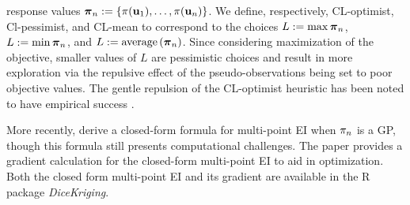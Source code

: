 \documentclass[12pt]{article}
\begin{document}
response values $\boldsymbol{\pi}_{n} := \{\pi(\mathbf{u}_1), \dots, \pi(\mathbf{u}_{n})\}$. We define, respectively, 
CL-optimist, Cl-pessimist, and CL-mean to correspond to the choices $L := \max \boldsymbol{\pi}_{n}$, 
$L := \min \boldsymbol{\pi}_{n}$, and $L := \text{average}\left(\boldsymbol{\pi}_{n}\right)$. Since considering maximization of the 
objective, smaller values of $L$ are pessimistic choices and result in more exploration via the repulsive effect of the pseudo-observations being set to poor 
objective values. The gentle repulsion of the CL-optimist heuristic has been noted to have empirical success \cite{Ginsbourger2010}. 

More recently, \cite{Chevalier2013} derive a closed-form formula for multi-point EI when ${\pi}_{n}$ is a GP, though this formula still 
presents computational challenges. The paper \cite{Marmin2015} provides a gradient calculation for the closed-form multi-point EI to aid in optimization. 
Both the closed form multi-point EI and its gradient are available in the R package \textit{DiceKriging}.
\end{document}
